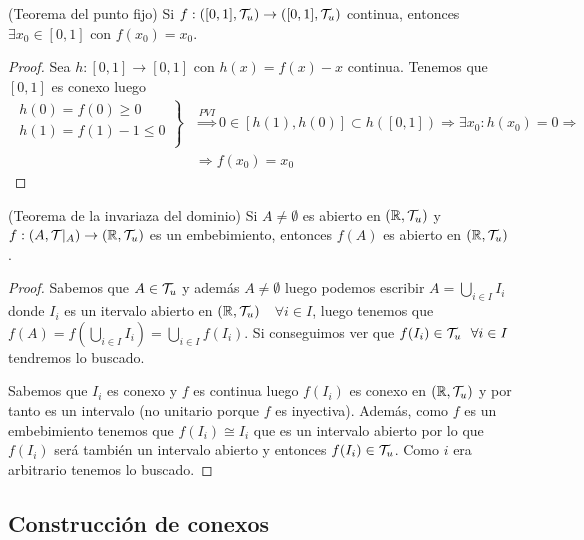 \begin{teo}
    (Teorema del punto fijo) Si $f:([0,1], \mathcal{T}_u)\to ([0,1], \mathcal{T}_u)$ continua, entonces $\exists x_0 \in [0,1]$ con $f(x_0)=x_0$.
    \begin{proof}
        Sea $h:[0,1]\to [0,1]$ con $h(x)=f(x)-x$ continua. Tenemos que $[0,1]$ es conexo luego
        \begin{align*}
            \left.
            \begin{array}{c}
                h(0)=f(0)\geq 0\\
                h(1)=f(1)-1 \leq 0\\
            \end{array}
            \right\} &\overset{PVI}{\Rightarrow} 0 \in [h(1),h(0)] \subset h([0,1]) \Rightarrow \exists x_0 : h(x_0)=0 \Rightarrow \\
            &\Rightarrow f(x_0) = x_0
        \end{align*}
    \end{proof}
\end{teo}

\begin{teo}
    (Teorema de la invariaza del dominio) Si $A\neq \emptyset $ es abierto en $(\mathbb{R}, \mathcal{T}_u)$ y $f:(A, \mathcal{T}|_A)\to (\mathbb{R}, \mathcal{T}_u)$ es un embebimiento, entonces $f(A)$ es abierto en $(\mathbb{R}, \mathcal{T}_u)$.

    \begin{proof}
        Sabemos que $A\in \mathcal{T}_u$ y además $A\neq \emptyset$ luego podemos escribir $A=\bigcup\limits_{i\in I}I_i$ donde $I_i$ es un itervalo abierto en $(\mathbb{R}, \mathcal{T}_u)$\ \ $\forall i \in I$, luego tenemos que $f(A)=f(\bigcup\limits_{i\in I}I_i)=\bigcup\limits_{i\in I}f(I_i)$. Si conseguimos ver que $f(I_i)\in \cc{T}_u\ \ \forall i \in I$ tendremos lo buscado. 

        Sabemos que $I_i$ es conexo y $f$ es continua luego $f(I_i)$ es conexo en $(\mathbb{R}, \mathcal{T}_u)$ y por tanto es un intervalo (no unitario porque $f$ es inyectiva). Además, como $f$ es un embebimiento tenemos que $f(I_i)\cong I_i$ que es un intervalo abierto por lo que $f(I_i)$ será también un intervalo abierto y entonces $f(I_i)\in \mathcal{T}_u$. Como $i$ era arbitrario tenemos lo buscado.

    \end{proof}
\end{teo}

\subsection{Construcción de conexos}

